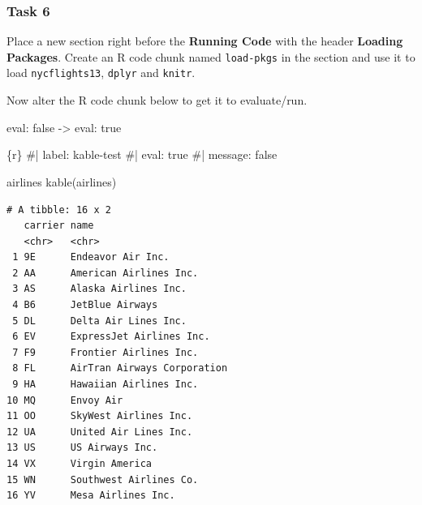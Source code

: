 \documentclass[
  letterpaper,
  DIV=11,
  numbers=noendperiod]{scrreprt}
\newenvironment{Shaded}{\begin{snugshade}}{\end{snugshade}}
\newcommand{\CommentTok}[1]{\textcolor[rgb]{0.37,0.37,0.37}{#1}}
\newcommand{\FunctionTok}[1]{\textcolor[rgb]{0.28,0.35,0.67}{#1}}
\newcommand{\InformationTok}[1]{\textcolor[rgb]{0.37,0.37,0.37}{#1}}
\newcommand{\NormalTok}[1]{\textcolor[rgb]{0.00,0.23,0.31}{#1}}
\begin{document}
\hypertarget{task-6}{%
\subsubsection*{Task 6}\label{task-6}}

Place a new section right before the \textbf{Running Code} with the
header \textbf{Loading Packages}. Create an R code chunk named
\texttt{load-pkgs} in the section and use it to load
\texttt{nycflights13}, \texttt{dplyr} and \texttt{knitr}.

Now alter the R code chunk below to get it to evaluate/run.

\begin{tcolorbox}[enhanced jigsaw, breakable, colback=white, bottomrule=.15mm, leftrule=.75mm, colframe=quarto-callout-important-color-frame, arc=.35mm, rightrule=.15mm, toprule=.15mm, left=2mm, opacityback=0]
eval: false -\textgreater{} eval: true
\end{tcolorbox}

\begin{Shaded}
\begin{Highlighting}[]
\InformationTok{\textasciigrave{}\textasciigrave{}\textasciigrave{}\{r\}}
\CommentTok{\#| label: kable{-}test}
\CommentTok{\#| eval: true}
\CommentTok{\#| message: false}

\NormalTok{airlines}
\FunctionTok{kable}\NormalTok{(airlines)}
\InformationTok{\textasciigrave{}\textasciigrave{}\textasciigrave{}}
\end{Highlighting}
\end{Shaded}

\begin{verbatim}
# A tibble: 16 x 2
   carrier name                       
   <chr>   <chr>                      
 1 9E      Endeavor Air Inc.          
 2 AA      American Airlines Inc.     
 3 AS      Alaska Airlines Inc.       
 4 B6      JetBlue Airways            
 5 DL      Delta Air Lines Inc.       
 6 EV      ExpressJet Airlines Inc.   
 7 F9      Frontier Airlines Inc.     
 8 FL      AirTran Airways Corporation
 9 HA      Hawaiian Airlines Inc.     
10 MQ      Envoy Air                  
11 OO      SkyWest Airlines Inc.      
12 UA      United Air Lines Inc.      
13 US      US Airways Inc.            
14 VX      Virgin America             
15 WN      Southwest Airlines Co.     
16 YV      Mesa Airlines Inc.         
\end{verbatim}
\end{document}
